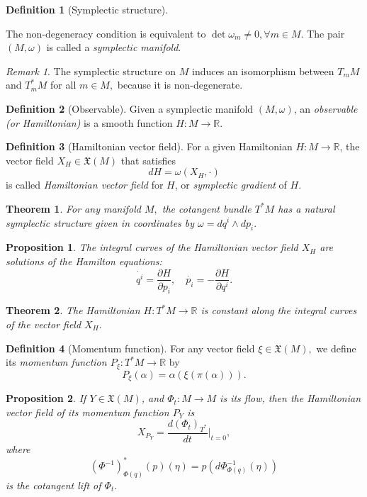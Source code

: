 \documentclass [xcolor=svgnames, t] {beamer}
\theoremstyle{definition}
\newtheorem{df}{Definition}
\theoremstyle{plain}
\newtheorem{prop}{Proposition}
\newtheorem{thm}{Theorem}
\theoremstyle{remark}
\newtheorem{rem}{Remark}
\begin{document}
\begin{frame}
\begin{df}[Symplectic structure]
\begin{enumerate}
	\end{enumerate}
	The non-degeneracy condition is equivalent to $ \operatorname{det} \omega_m\neq 0, \forall m\in M $. The pair $ (M,\omega) $ is called a \textit{symplectic manifold}. 
\end{df}
\begin{rem}
	The symplectic structure on $ M $ induces an isomorphism between $ T_mM $ and $ T_m^*M $ for all $ m\in M, $ because it is non-degenerate. 
\end{rem}
\begin{df}[Observable]
	Given a symplectic manifold  $ (M,\omega) $, an \textit{observable (or Hamiltonian)} is a smooth function $ H: M \rightarrow \mathbb{R}. $
\end{df}
\begin{df}[Hamiltonian vector field]
	For a given Hamiltonian $ H: M \rightarrow \mathbb{R} $, the vector field $ X_H\in \mathfrak{X}(M) $ that satisfies $$ dH = \omega(X_H, \cdot) $$ is called \textit{Hamiltonian vector field} for $ H $, or \textit{symplectic gradient} of $ H. $ 
\end{df}
\begin{thm}
	For any manifold $ M, $ the cotangent bundle $ T^*M $ has a natural symplectic structure given in coordinates by $\omega = dq^i\wedge dp_i.$
\end{thm}
\begin{prop}
	The integral curves of the Hamiltonian vector field $ X_H $ are solutions of the Hamilton equations:
 $$\dot{q^i} = \frac{\partial H}{\partial p_i}, \quad \dot{p_i} =- \frac{\partial H}{\partial q^i}.    $$
\end{prop}
\begin{thm}
The Hamiltonian $ H: T^*M \rightarrow \mathbb{R} $ is constant along the integral curves of the vector field $ X_H. $ 	
\end{thm}
\begin{df}[Momentum function]
	For any vector field $ \xi\in \mathfrak{X}(M), $ we define its \textit{ momentum function $ P_\xi:T^*M \rightarrow \mathbb{R} $} by
	$$ P_\xi(\alpha)= \alpha(\xi(\pi(\alpha))). $$ 
\end{df}
\begin{prop}
	If $ Y\in \mathfrak{X}(M) $, and $ \Phi_t: M \rightarrow M $ is its flow, then the Hamiltonian vector field of its momentum function $ P_Y $ is 
$$ X_{P_Y} = \frac{d(\Phi_t)_{T^*}}{dt} \Big|_{t=0},  $$ 
where 
$$ (\Phi^{-1})^*_{\Phi(q)}(p)(\eta) = p \left( d\Phi^{-1}_{\Phi(q)}(\eta) \right) $$ 
is the cotangent lift of $ \Phi_t. $ 

\end{prop}
\end{frame}
\end{document}
